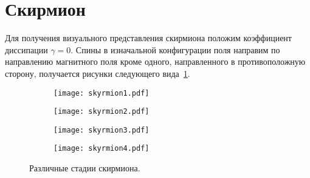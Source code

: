 \section{Скирмион}
Для получения визуального представления скирмиона положим коэффициент
диссипации $\gamma=0$. Спины в изначальной конфигурации поля направим по
направлению магнитного поля кроме одного, направленного в противоположную
сторону, получается рисунки следующего вида~\ref{fig:skyrmion}.

\begin{figure}[H]
    \centering
    \begin{subfigure}[b]{0.49\textwidth}
        \texttt{[image: skyrmion1.pdf]}
    \end{subfigure}
    \begin{subfigure}[b]{0.49\textwidth}
        \texttt{[image: skyrmion2.pdf]}
    \end{subfigure}
    \begin{subfigure}[b]{0.49\textwidth}
        \texttt{[image: skyrmion3.pdf]}
    \end{subfigure}
    \begin{subfigure}[b]{0.49\textwidth}
        \texttt{[image: skyrmion4.pdf]}
    \end{subfigure}
    \caption{Различные стадии скирмиона.}
\label{fig:skyrmion}
\end{figure}
